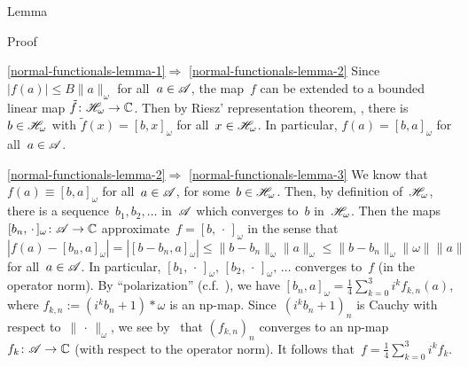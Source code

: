 \documentclass[a]{subfiles}
\begin{document}
\begin{parsec}
\begin{point}{Lemma}
\begin{point}{Proof}
\begin{point}{%
\ref{normal-functionals-lemma-1}$\Longrightarrow$%
\ref{normal-functionals-lemma-2}}%
Since~$\left|f(a)\right|\leq B\|a\|_\omega$ for all~$a\in\mathscr{A}$,
the map~$f$ can be extended to a bounded linear map 
$\tilde{f}\colon \mathscr{H}_\omega\to \mathbb{C}$.
Then by Riesz' representation theorem, ,
there is~$b\in \mathscr{H}_\omega$ with $\tilde{f}(x)=[b,x]_\omega$
for all~$x\in \mathscr{H}_\omega$.  
In particular,
$f(a)=[b,a]_\omega$ for all~$a\in \mathscr{A}$.
\end{point}
\begin{point}{\ref{normal-functionals-lemma-2}$\Longrightarrow$%
\ref{normal-functionals-lemma-3}}%
We know that~$f(a)\equiv [b,a]_\omega$ for all~$a\in \mathscr{A}$,
for some~$b\in\mathscr{H}_\omega$.
Then, by definition of~$\mathscr{H}_\omega$,
there is a sequence~$b_1,b_2,\dotsc$ in~$\mathscr{A}$
which converges to~$b$ in~$\mathscr{H}_\omega$.
Then the maps $[b_n,\,\cdot\,]_\omega\colon \mathscr{A}\to \mathbb{C}$
approximate~$f=[b,\,\cdot\,]_\omega$
in the sense that 
$\left|f(a)-[b_n,a]_\omega\right|=\left|[b-b_n,a]_\omega\right|
\leq \|b-b_n\|_\omega \|a\|_\omega
\leq \|b-b_n\|_\omega \|\omega\| \|a\|$
for all~$a\in \mathscr{A}$.
In particular, $[b_1,\,\cdot\,]_\omega,\,[b_2,\,\cdot\,]_\omega,\,\dotsc$
converges to~$f$ (in the operator norm).
By ``polarization'' (c.f.~),
we have $[b_n,a]_\omega = \frac{1}{4}\sum_{k=0}^3 i^kf_{k,n}(a)$,
where $f_{k,n} := (i^kb_n+1)*\omega$ is an np-map.
Since~$(i^kb_n+1)_n$ is Cauchy with respect to~$\|\,\cdot\,\|_\omega$,
we see by~ that 
$(f_{k,n})_n$ converges to an np-map $f_k\colon \mathscr{A}\to\mathbb{C}$
(with respect to the operator norm).
It follows that~$f=\frac{1}{4}\sum_{k=0}^3 i^k f_k$.


\end{point}
\end{point}
\end{point}
\end{parsec}
\end{document}
